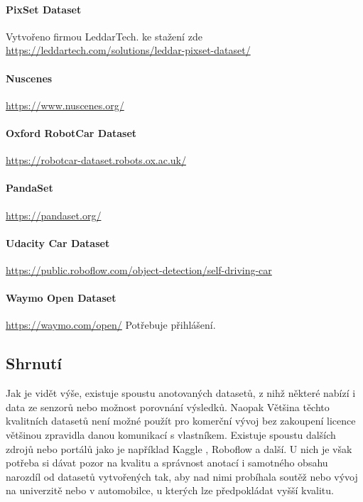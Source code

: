 \documentclass[czech, bc, kky, he, iso690numb]{fasthesis}
\begin{document}
  			\paragraph{PixSet Dataset}
  				Vytvořeno firmou LeddarTech. ke stažení zde \href{https://leddartech.com/solutions/leddar-pixset-dataset/}{https://leddartech.com/solutions/leddar-pixset-dataset/}
  			\paragraph{Nuscenes}
  				\href{https://www.nuscenes.org/}{https://www.nuscenes.org/}
  			\paragraph{Oxford RobotCar Dataset}
  				\href{https://robotcar-dataset.robots.ox.ac.uk/}{https://robotcar-dataset.robots.ox.ac.uk/}
  			\paragraph{PandaSet}
  				\href{https://pandaset.org/}{https://pandaset.org/}
  			\paragraph{Udacity Car Dataset}
  				\href{https://public.roboflow.com/object-detection/self-driving-car}{https://public.roboflow.com/object-detection/self-driving-car}
  			\paragraph{Waymo Open Dataset}
  				\href{https://waymo.com/open/}{https://waymo.com/open/} Potřebuje přihlášení.
  			\subsection{Shrnutí}
  				Jak je vidět výše, existuje spoustu anotovaných datasetů, z nihž některé nabízí i data ze senzorů nebo možnost porovnání výsledků. Naopak Většina těchto kvalitních datasetů není možné použít pro komerční vývoj bez zakoupení licence většinou zpravidla danou komunikací s vlastníkem. Existuje spoustu dalších zdrojů nebo portálů jako je například Kaggle \cite{Kaggle}, Roboflow \cite{Roboflow} a další. U nich je však potřeba si dávat pozor na kvalitu a správnost anotací i samotného obsahu narozdíl od datasetů vytvořených tak, aby nad nimi probíhala soutěž nebo vývoj na univerzitě nebo v automobilce, u kterých lze předpokládat vyšší kvalitu.
\end{document}
